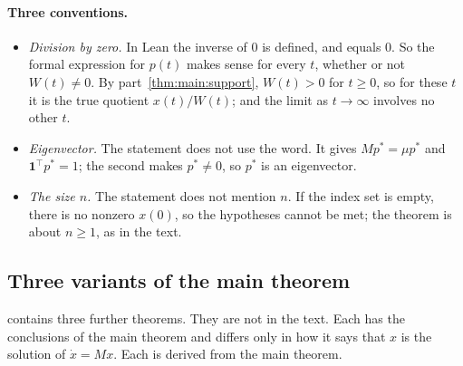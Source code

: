 \documentclass[11pt]{article}
\theoremstyle{definition}
\theoremstyle{remark}
\newcommand{\one}{\mathbf{1}}
\newcommand{\T}{\top}
\begin{document}
\paragraph{Three conventions.}
\begin{itemize}[leftmargin=2em]
  \item \emph{Division by zero.} In Lean the inverse of $0$ is defined, and equals $0$. So the
        formal expression for $p(t)$ makes sense for every $t$, whether or not $W(t) \ne 0$. By
        part~\ref{thm:main:support}, $W(t) > 0$ for $t \ge 0$, so for these $t$ it is the true
        quotient $x(t)/W(t)$; and the limit as $t \to \infty$ involves no other $t$.
  \item \emph{Eigenvector.} The statement does not use the word. It gives $M p^* = \mu p^*$ and
        $\one^\T p^* = 1$; the second makes $p^* \ne 0$, so $p^*$ is an eigenvector.
  \item \emph{The size $n$.} The statement does not mention $n$. If the index set is empty,
        there is no nonzero $x(0)$, so the hypotheses cannot be met; the theorem is about
        $n \ge 1$, as in the text.
\end{itemize}

\subsection{Three variants of the main theorem}\label{sec:lean:variants}

 contains three further theorems. They are not in the text. Each has the
conclusions of the main theorem and differs only in how it says that $x$ is the solution of
$\dot{x} = Mx$. Each is derived from the main theorem.
\end{document}
